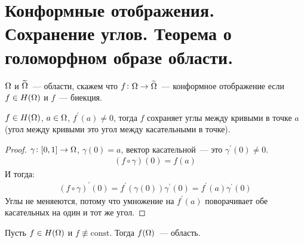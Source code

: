 \section{Конформные отображения. Сохранение углов. Теорема о голоморфном образе области.}

\begin{definition}
    $\Omega$ и $\widetilde{\Omega}$~--- области,
    скажем что $f \colon \Omega \to \widetilde{\Omega}$~--- конформное
    отображение если $f \in H(\Omega)$ и $f$~--- биекция.
\end{definition}

\begin{theorem}
    $f\in H(\Omega)$, $a \in \Omega$, $f^\prime(a) \ne 0$,
    тогда $f$ сохраняет углы между кривыми в точке $a$
    (угол между кривыми это угол между касательными в точке).
\end{theorem}

\begin{proof}
    $\gamma\colon [0, 1] \to \Omega$, $\gamma(0) = a$,
    вектор касательной~--- это $\gamma^\prime(0) \ne 0$.
    \begin{gather*}
        (f \circ \gamma )(0) = f(a)
    \end{gather*}
    И тогда: 
    \begin{gather*}
        (f\circ\gamma)^\prime(0) = f^\prime(\gamma(0))\gamma^\prime(0) = f^\prime(a)\gamma^\prime(0)
    \end{gather*}
    Углы не меняеются, потому что умножение на $f^\prime(a)$
    поворачивает обе касательных на один и тот же угол.
\end{proof}

\begin{theorem}
    Пусть $f \in H(\Omega)$ и $f \not\equiv \mathrm{const}$.
    Тогда $f(\Omega)$~--- область.
\end{theorem}

